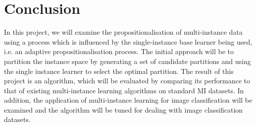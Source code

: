 \documentclass[a4paper,12pt]{article} %
\begin{document}
\section{Conclusion}

In this project, we will examine the propositionalisation of multi-instance data using a process which is influenced by the single-instance base learner being used, i.e. an adaptive propositionalisation process. The initial approach will be to partition the instance space by generating a set of candidate partitions and using the single instance learner to select the optimal partition. 
The result of this project is an algorithm, which will be evaluated by comparing its performance to that of existing multi-instance learning algorithms on standard MI datasets. 
In addition, the application of multi-instance learning for image classification will be examined and the algorithm will be tuned for dealing with image classification datasets.
\clearpage
 

\end{document}
